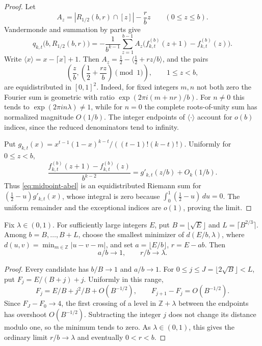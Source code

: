 \begin{proof}
Let
\[
 A_z=|R_{1/2}(b,r)\cap[z]|-\frac rbz
 \qquad(0\le z\le b).
\]
Vandermonde and summation by parts give
\begin{equation}\label{eq:midpoint-abel}
 q_{k,t}\bigl(b,R_{1/2}(b,r)\bigr)
 =-\frac1{b^{k-1}}\sum_{z=1}^{b-1}
 A_z\bigl(f_{k,t}^{(b)}(z+1)-f_{k,t}^{(b)}(z)\bigr).
\end{equation}
Write $\langle x\rangle=x-\lceil x\rceil+1$.  Then
$A_z=\frac12-\langle\frac12+rz/b\rangle$, and the pairs
\[
 \left(\frac zb,\left(\frac12+\frac{rz}{b}\right)\!\!\pmod1\right),
 \qquad 1\le z<b,
\]
are equidistributed in $[0,1]^2$.  Indeed, for fixed integers $m,n$ not
both zero the Fourier sum is geometric with ratio
$\exp(2\pi i(m+nr)/b)$.  For $n\ne0$ this tends to
$\exp(2\pi i n\lambda)\ne1$, while for $n=0$ the complete roots-of-unity
sum has normalized magnitude $O(1/b)$.  The integer endpoints of
$\langle\cdot\rangle$ account for $o(b)$ indices, since the reduced
denominators tend to infinity.

Put
$g_{k,t}(x)=x^{t-1}(1-x)^{k-t}/((t-1)!(k-t)!)$.  Uniformly for
$0\le z<b$,
\[
 \frac{f_{k,t}^{(b)}(z+1)-f_{k,t}^{(b)}(z)}{b^{k-2}}
 =g'_{k,t}(z/b)+O_k(1/b).
\]
Thus \eqref{eq:midpoint-abel} is an equidistributed Riemann sum for
$(\frac12-u)g'_{k,t}(x)$, whose integral is zero because
$\int_0^1(\frac12-u)\,du=0$.  The uniform remainder and the exceptional
indices are $o(1)$, proving the limit.
\end{proof}

\begin{lemma}\label{lem:dimension-search}
Fix $\lambda\in(0,1)$. For sufficiently large integers $E$, put
$B=\lfloor\sqrt E\rfloor$ and $L=\lceil B^{2/3}\rceil$.
Among $b=B,\ldots,B+L$, choose the smallest minimizer of
$d(E/b,\lambda)$, where $d(u,v)=\min_{m\in\mathbb Z}|u-v-m|$,
and set $a=\lfloor E/b\rfloor$, $r=E-ab$. Then
\begin{equation}\label{eq:dimension-search}
 a/b\longrightarrow1,\qquad r/b\longrightarrow\lambda.
\end{equation}
\end{lemma}
\begin{proof}
Every candidate has $b/B\to1$ and $a/b\to1$. For
$0\le j\le J=\lfloor2\sqrt B\rfloor<L$, put $F_j=E/(B+j)+j$.
Uniformly in this range,
\[
 F_j=E/B+j^2/B+O(B^{-1/2}),\qquad
 F_{j+1}-F_j=O(B^{-1/2}).
\]
Since $F_J-F_0\to4$, the first crossing of a level in
$\mathbb Z+\lambda$ between the endpoints has overshoot $O(B^{-1/2})$.
Subtracting the integer $j$ does not change its distance modulo one,
so the minimum tends to zero. As $\lambda\in(0,1)$, this gives the
ordinary limit $r/b\to\lambda$ and eventually $0<r<b$.
\end{proof}


